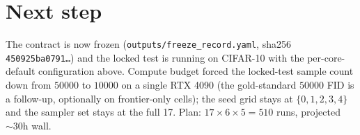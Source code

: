 \documentclass[11pt]{article}
\begin{document}
\section{Next step}

The contract is now frozen (\texttt{outputs/freeze\_record.yaml}, sha256 \texttt{450925ba0791\ldots}) and the locked test is running on CIFAR-10 with the per-core-default configuration above. Compute budget forced the locked-test sample count down from $50000$ to $10000$ on a single RTX 4090 (the gold-standard $50000$ FID is a follow-up, optionally on frontier-only cells); the seed grid stays at $\{0, 1, 2, 3, 4\}$ and the sampler set stays at the full 17. Plan: $17 \times 6 \times 5 = 510$ runs, projected $\sim 30$h wall.
\end{document}
